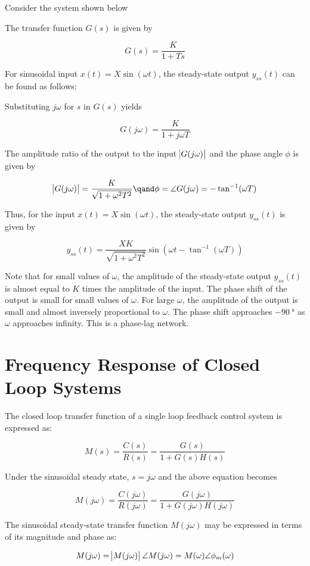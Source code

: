 \documentclass[
  14pt,
  a4paper,
  oneside,
  open=any,
  a4paper,
  14pt]{report}
\begin{document}
Consider the system shown below

The transfer function \(G(s)\) is given by

\[
    G(s) = \dfrac{K}{1+Ts}
\]

For sinusoidal input \(x(t) = X \sin(\omega t)\), the steady-state
output \(y_{ss}(t)\) can be found as follows:

Substituting \(j\omega\) for \(s\) in \(G(s)\) yields

\[
    G(j\omega) = \dfrac{K}{1+j\omega T}
\]

The amplitude ratio of the output to the input \(\abs{G(j\omega)}\) and
the phase angle \(\phi\) is given by

\[
    \abs{G(j\omega)} = \dfrac{K}{\sqrt{1+\omega^2T^2}} \qand \phi = \angle G(j\omega) = -\tan^{-1}(\omega T)
\]

Thus, for the input \(x(t) = X \sin(\omega t)\), the steady-state output
\(y_{ss}(t)\) is given by

\[
    y_{ss}(t) = \dfrac{XK}{\sqrt{1+\omega^2T^2}} \sin(\omega t - \tan^{-1}(\omega T))
\]

Note that for small values of \(\omega\), the amplitude of the
steady-state output \(y_{ss}(t)\) is almost equal to \(K\) times the
amplitude of the input. The phase shift of the output is small for small
values of \(\omega\). For large \(\omega\), the amplitude of the output
is small and almost inversely proportional to \(\omega\). The phase
shift approaches \(\SI{-90}{\degree}\) as \(\omega\) approaches
infinity. This is a phase-lag network.

\section{Frequency Response of Closed Loop
Systems}\label{frequency-response-of-closed-loop-systems}

The closed loop transfer function of a single loop feedback control
system is expressed as:

\[
M(s) = \dfrac{C(s)}{R(s)} = \dfrac{G(s)}{1+G(s)H(s)}
\]

Under the sinusoidal steady state, \(s=j\omega\) and the above equation
becomes

\[
M(j\omega) = \dfrac{C(j\omega)}{R(j\omega)} = \dfrac{G(j\omega)}{1+G(j\omega)H(j\omega)}
\]

The sinusoidal steady-state transfer function \(M(j\omega)\) may be
expressed in terms of its magnitude and phase as:

\[
M(j\omega) = \abs{M(j\omega)} \angle M(j\omega) = M(\omega) \angle \phi_m (\omega)
\]
\end{document}
